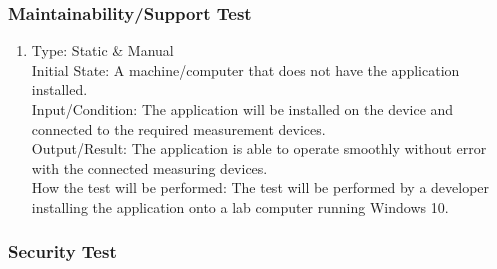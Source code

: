 \documentclass[12pt, titlepage]{article}
\begin{document}
\subsubsection{Maintainability/Support Test}

\begin{adjustwidth}{2.2em}{0pt}
\begin{enumerate}[{NF-MT}1.]
    \item Type: Static \& Manual\\ \label{MT1}
    Initial State: A machine/computer that does not have the application installed.\\
    Input/Condition: The application will be installed on the device and connected to the required measurement devices.\\
    Output/Result: The application is able to operate smoothly without error with the connected measuring devices.\\
    How the test will be performed: The test will be performed by a developer installing the application onto a lab computer running Windows 10.
\end{enumerate}
\end{adjustwidth}

\subsubsection{Security Test}
\end{document}

